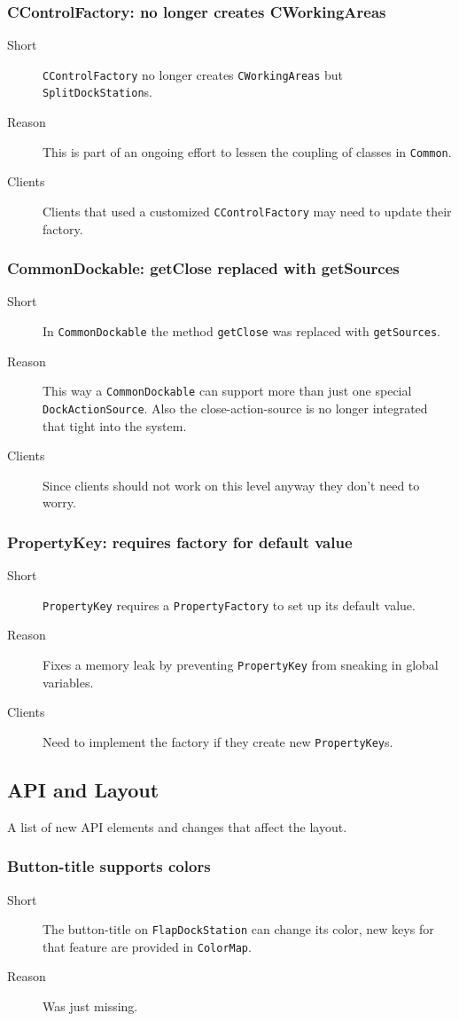 \documentclass[a4paper,10pt]{article}
\newcommand{\src}[1]{\lstinline[basicstyle=\normalsize\ttfamily,keywordstyle=\normalsize\ttfamily,identifierstyle=\normalsize\ttfamily]|#1|}
\newcommand{\short}{\item[Short]}
\newcommand{\why}{\item[Reason]}
\newcommand{\clients}{\item[Clients]}
\begin{document}
\subsubsection{CControlFactory: no longer creates CWorkingAreas}
\begin{description}
 \short \src{CControlFactory} no longer creates \src{CWorkingAreas} but \linebreak \src{SplitDockStation}s.
 \why This is part of an ongoing effort to lessen the coupling of classes in \src{Common}.
 \clients Clients that used a customized \src{CControlFactory} may need to update their factory.
\end{description}

\subsubsection{CommonDockable: getClose replaced with getSources}
\begin{description}
 \short In \src{CommonDockable} the method \src{getClose} was replaced with \linebreak \src{getSources}.
 \why This way a \src{CommonDockable} can support more than just one special \src{DockActionSource}. Also the close-action-source is no longer integrated that tight into the system.
 \clients Since clients should not work on this level anyway they don't need to worry.
\end{description}

\subsubsection{PropertyKey: requires factory for default value}
\begin{description}
 \short \src{PropertyKey} requires a \src{PropertyFactory} to set up its default value.
 \why Fixes a memory leak by preventing \src{PropertyKey} from sneaking in global variables.
 \clients Need to implement the factory if they create new \src{PropertyKey}s.
\end{description}

\subsection{API and Layout}
A list of new API elements and changes that affect the layout.

\subsubsection{Button-title supports colors}
\begin{description}
 \short The button-title on \src{FlapDockStation} can change its color, new keys for that feature are provided in \src{ColorMap}.
 \why Was just missing.
\end{description}
\end{document}
